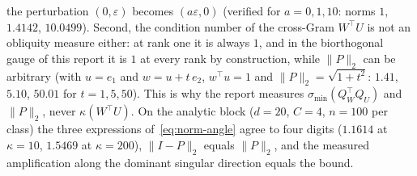 \documentclass[11pt,a4paper]{article}
\theoremstyle{plain}
\theoremstyle{definition}
\theoremstyle{remark}
\newcommand{\T}{\top}
\begin{document}
the perturbation $(0,\varepsilon)$ becomes $(a\varepsilon,0)$ (verified for
$a=0,1,10$: norms $1$, $1.4142$, $10.0499$). Second, the condition number of
the cross-Gram $W^\T U$ is not an obliquity measure either: at rank one it is
always $1$, and in the biorthogonal gauge of this report it is $1$ at every
rank by construction, while $\|P\|_2$ can be arbitrary (with $u=e_1$ and
$w=u+t\,e_2$, $w^\T u=1$ and $\|P\|_2=\sqrt{1+t^2}$: $1.41$, $5.10$, $50.01$
for $t=1,5,50$). This is why the report measures
$\sigma_{\min}(Q_W^\T Q_U)$ and $\|P\|_2$, never $\kappa(W^\T U)$. On the
analytic block ($d=20$, $C=4$, $n=100$ per class) the three expressions
of~\eqref{eq:norm-angle} agree to four digits ($1.1614$ at $\kappa=10$,
$1.5469$ at $\kappa=200$), $\|I-P\|_2$ equals $\|P\|_2$, and the measured
amplification along the dominant singular direction equals the bound.
\end{document}
